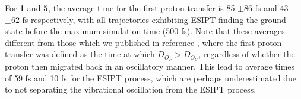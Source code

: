 For \textbf{1} and \textbf{5}, the average time for the first proton transfer is 85 $\pm 86$ fs and 43 $\pm 62$ fs respectively, with all trajectories exhibiting ESIPT finding the ground state before the maximum simulation time (500 fs). Note that these averages different from those which we published in reference , where the first proton transfer was defined as the time at which $D_{O_{P}} > D_{O_{C}}$, regardless of whether the proton then migrated back in an oscillatory manner. This lead to average times of 59 fs and 10 fs for the ESIPT process, which are perhaps underestimated due to not separating the vibrational oscillation from the ESIPT process. 

